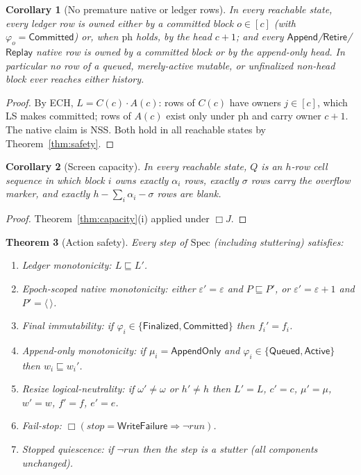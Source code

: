 \documentclass[11pt]{article}
\newcommand{\seq}[1]{\langle #1\rangle}
\newcommand{\emptyseq}{\seq{\,}}
\newcommand{\pre}{\sqsubseteq}                 %
\newcommand{\cat}{\mathbin{\cdot}}             %
\newcommand{\AppendOnly}{\mathsf{AppendOnly}}
\newcommand{\Queued}{\mathsf{Queued}}
\newcommand{\Active}{\mathsf{Active}}
\newcommand{\Finalized}{\mathsf{Finalized}}
\newcommand{\Committed}{\mathsf{Committed}}
\newcommand{\srcApp}{\mathsf{Append}}
\newcommand{\srcRet}{\mathsf{Retire}}
\newcommand{\srcRep}{\mathsf{Replay}}
\newcommand{\stWF}{\mathsf{WriteFailure}}
\newcommand{\PH}{\mathrm{ph}}
\newcommand{\Ledger}{L}
\newcommand{\Native}{P}
\newcommand{\Scr}{Q}
\newcommand{\run}{\mathit{run}}
\newcommand{\stopr}{\mathit{stop}}
\newtheorem{theorem}{Theorem}[section]
\newtheorem{corollary}[theorem]{Corollary}
\theoremstyle{definition}
\theoremstyle{remark}
\begin{document}
\begin{corollary}[No premature native or ledger rows]\label{cor:nph}
In every reachable state, every ledger row is owned either by a committed
block $o\in[c]$ (with $\varphi_o=\Committed$) or, when $\PH$ holds, by the
head $c{+}1$; and every $\srcApp$/$\srcRet$/$\srcRep$ native row is owned by
a committed block or by the append-only head. In particular no row of a
queued, merely-active mutable, or unfinalized non-head block ever reaches
either history.
\end{corollary}

\begin{proof}
By ECH, $\Ledger=C(c)\cat A(c)$: rows of $C(c)$ have owners $j\in[c]$, which
LS makes committed; rows of $A(c)$ exist only under $\PH$ and carry owner
$c{+}1$. The native claim is NSS. Both hold in all reachable states by
Theorem~\ref{thm:safety}.
\end{proof}

\begin{corollary}[Screen capacity]\label{cor:sc}
In every reachable state, $\Scr$ is an $h$-row cell sequence in which block
$i$ owns exactly $\alpha_i$ rows, exactly $\sigma$ rows carry the overflow
marker, and exactly $h-\sum_i\alpha_i-\sigma$ rows are blank.
\end{corollary}

\begin{proof}
Theorem~\ref{thm:capacity}(i) applied under $\Box J$.
\end{proof}

\begin{theorem}[Action safety]\label{thm:actions}
Every step of $\mathrm{Spec}$ (including stuttering) satisfies:
\begin{enumerate}
\item[(i)] \emph{Ledger monotonicity:} $\Ledger\pre\Ledger'$.
\item[(ii)] \emph{Epoch-scoped native monotonicity:} either
  $\varepsilon'=\varepsilon$ and $\Native\pre\Native'$, or
  $\varepsilon'=\varepsilon+1$ and $\Native'=\emptyseq$.
\item[(iii)] \emph{Final immutability:} if
  $\varphi_i\in\{\Finalized,\Committed\}$ then $f_i'=f_i$.
\item[(iv)] \emph{Append-only monotonicity:} if $\mu_i=\AppendOnly$ and
  $\varphi_i\in\{\Queued,\Active\}$ then $w_i\pre w_i'$.
\item[(v)] \emph{Resize logical-neutrality:} if $\omega'\ne\omega$ or
  $h'\ne h$ then $\Ledger'=\Ledger$, $c'=c$, $\mu'=\mu$, $w'=w$, $f'=f$,
  $e'=e$.
\item[(vi)] \emph{Fail-stop:} $\Box(\stopr=\stWF \Rightarrow \neg\run)$.
\item[(vii)] \emph{Stopped quiescence:} if $\neg\run$ then the step is a
  stutter (all components unchanged).
\end{enumerate}
\end{theorem}
\end{document}
